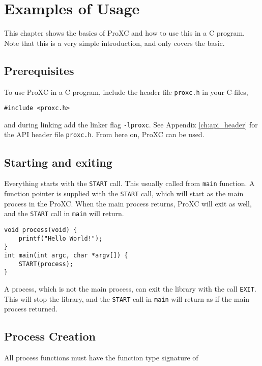 
\chapter{Examples of Usage}
\label{ch:examples_usage}

This chapter shows the basics of ProXC and how to use this in a C program. Note that this is a very simple introduction, and only covers the basic.

\section*{Prerequisites}

To use ProXC in a C program, include the header file \texttt{proxc.h} in your C\hyp{}files, 

\begin{lstlisting}[style={CustomC},frame={},numbers={none}]
#include <proxc.h>
\end{lstlisting}

\noindent and during linking add the linker flag \texttt{-lproxc}. See Appendix \ref{ch:api_header} for the API header file \texttt{proxc.h}. From here on, ProXC can be used.

\section*{Starting and exiting}

Everything starts with the \texttt{START} call. This usually called from \texttt{main} function. A function pointer is supplied with the \texttt{START} call, which will start as the main process in the ProXC. When the main process returns, ProXC will exit as well, and the \texttt{START} call in \texttt{main} will return.

\begin{lstlisting}[style={CustomC},caption={Hello World in ProXC}]
void process(void) {
    printf("Hello World!");
}
int main(int argc, char *argv[]) {
    START(process);
}
\end{lstlisting}

A process, which is not the main process, can exit the library with the call \texttt{EXIT}. This will stop the library, and the \texttt{START} call in \texttt{main} will return as if the main process returned. 

\section*{Process Creation}
All process functions must have the function type signature of

